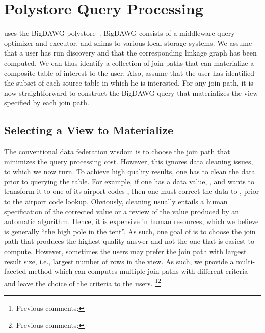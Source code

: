 \section{Polystore Query Processing}
\label{sec:curating}


\dcv uses the BigDAWG polystore~\cite{DBLP:journals/pvldb/ElmoreDSBCGHHKK15}. 
BigDAWG  consists of a middleware query optimizer and executor, and shims to various local storage systems.
We assume that a user has run discovery and that the corresponding linkage graph has been computed. 
We can thus identify a collection of join paths that can materialize a composite table of interest to the user.  
Also, assume that the user has identified the subset of each source table in which he is interested. 
For any join path, it is now straightforward to construct the BigDAWG query that materializes the view specified by each join path. 

\subsection{Selecting a View to Materialize}



The conventional data federation wisdom is to choose the join path that minimizes the query processing cost. However, this ignores data cleaning issues, to which we now turn. To achieve high quality results, one has to clean the data prior to querying the table. For example, if one has a data value, , and wants to transform it to one of its airport codes , then one must correct the data to , prior to the airport code lookup. Obviously, cleaning usually entails a human specification of the corrected value or a review of the value produced by an automatic algorithm. Hence, it is expensive in human resources, which we believe is generally ``the high pole in the tent''. As such, one goal of \dcv is to choose the join path that produces the highest quality answer and not the one that is easiest to compute. However, sometimes the users may prefer the join path with largest result size, i.e., largest number of rows in the view. As such, we provide a multi-faceted method which can computes multiple join paths with different criteria  and leave the choice of the criteria to the users. \footnote{Previous comments: }\footnote{Previous comments: }


